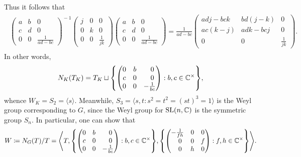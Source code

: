 \begin{example}
\begin{align*}
\begin{split}
\end{split}
\end{align*}
\noindent Thus it follows that
\begin{align*}
\begin{split}
\begin{pmatrix}a&b&0\\c&d&0\\0&0&\frac{1}{ad-bc}\end{pmatrix}^{\!\!-1}\!\begin{pmatrix}j&0&0\\0&k&0\\0&0&\frac{1}{jk}\end{pmatrix}\!\begin{pmatrix}a&b&0\\c&d&0\\0&0&\frac{1}{ad-bc}\end{pmatrix} = \frac{1}{ad-bc}\begin{pmatrix}adj-bck&bd(j-k)&0\\ac(k-j)&adk-bcj&0\\0&0&\frac{1}{jk}\end{pmatrix}\!.
\end{split}
\end{align*}
\noindent In other words,
\begin{align*}
\begin{split}
N_K(T_K) = T_K \sqcup \left\{\begin{pmatrix}0&b&\hphantom{-}0\\c&0&\hphantom{-}0\\0&0&-\frac{1}{bc}\end{pmatrix} : b, c \in \mathbb{C}^\times\right\}\!,
\end{split}
\end{align*}
\noindent whence $W_K = S_2 = \langle s\rangle$. Meanwhile, $S_3 = \langle s, t : s^2 = t^2 = (st)^3 = 1\rangle$ is the Weyl group corresponding to $G$, since the Weyl group for $\textup{SL}(n, \mathbb{C})$ is the symmetric group $S_n$. In particular, one can show that
\begin{align*}
\begin{split}
W \coloneqq N_G(T)/T = \left\langle T, \left\{\begin{pmatrix}0&b&\hphantom{-}0\\c&0&\hphantom{-}0\\0&0&-\frac{1}{bc}\end{pmatrix} : b, c \in \mathbb{C}^\times\right\}\!, \left\{\begin{pmatrix}-\frac{1}{fh}&0&0\\\hphantom{-}0&0&f\\\hphantom{-}0&h&0\end{pmatrix} : f, h \in \mathbb{C}^\times\right\}\right\rangle\!.

\end{split}
\end{align*}
\end{example}
